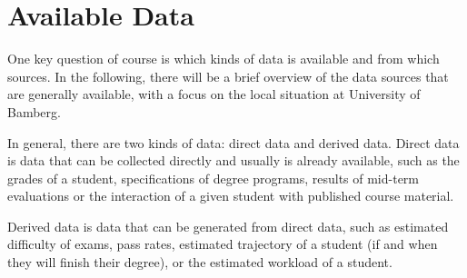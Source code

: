 \section{Available Data}
\label{sec:data}

One key question of course is which kinds of data is available and from which sources. In the following, there will be a brief overview of the data sources that are generally available, with a focus on the local situation at University of Bamberg.

In general, there are two kinds of data: direct data and derived data. Direct data is data that can be collected directly and usually is already available, such as the grades of a student, specifications of degree programs, results of mid-term evaluations or the interaction of a given student with published course material.

Derived data is data that can be generated from direct data, such as estimated difficulty of exams, pass rates, estimated trajectory of a student (if and when they will finish their degree), or the estimated workload of a student.
